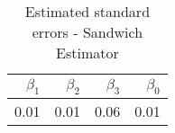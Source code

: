 \begin{table}[ht]
\centering
\begin{tabular}{rrrr}
  \hline
$\beta_1$ & $\beta_2$ & $\beta_3$ & $\beta_0$ \\ 
  \hline
0.01 & 0.01 & 0.06 & 0.01 \\ 
   \hline
\end{tabular}
\caption{Estimated standard errors - Sandwich Estimator} 
\label{tab:sandwich}
\end{table}
